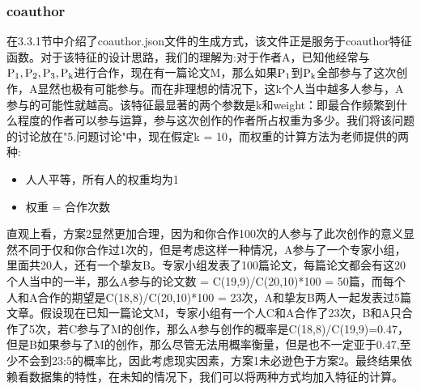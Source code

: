 \documentclass{mcmthesis}
\begin{document}
	\subsubsection{coauthor}
		\par 在3.3.1节中介绍了coauthor.json文件的生成方式，该文件正是服务于coauthor特征函数。对于该特征的设计思路，我们的理解为:对于作者A，已知他经常与$\rm P_1,P_2,P_3,P_k$进行合作，现在有一篇论文M，那么如果$\rm P_1$到$\rm P_k$全部参与了这次创作，A显然也极有可能参与。而在非理想的情况下，这k个人当中越多人参与，A参与的可能性就越高。该特征最显著的两个参数是k和weight：即最合作频繁到什么程度的作者可以参与运算，参与这次创作的作者所占权重为多少。我们将该问题的讨论放在"5.问题讨论"中，现在假定k = 10，而权重的计算方法为老师提供的两种:
		\begin{itemize}
			\item 人人平等，所有人的权重均为1
			\item 权重 = 合作次数
		\end{itemize}
		\par 直观上看，方案2显然更加合理，因为和你合作100次的人参与了此次创作的意义显然不同于仅和你合作过1次的，但是考虑这样一种情况，A参与了一个专家小组，里面共20人，还有一个挚友B。专家小组发表了100篇论文，每篇论文都会有这20个人当中的一半，那么A参与的论文数 = C(19,9)/C(20,10)*100 = 50篇，而每个人和A合作的期望是C(18,8)/C(20,10)*100 = 23次，A和挚友B两人一起发表过5篇文章。假设现在已知一篇论文M，专家小组有一个人C和A合作了23次，B和A只合作了5次，若C参与了M的创作，那么A参与创作的概率是C(18,8)/C(19,9)=0.47，但是B如果参与了M的创作，那么尽管无法用概率衡量，但是也不一定亚于0.47,至少不会到23:5的概率比，因此考虑现实因素，方案1未必逊色于方案2。最终结果依赖看数据集的特性，在未知的情况下，我们可以将两种方式均加入特征的计算。
\end{document}
